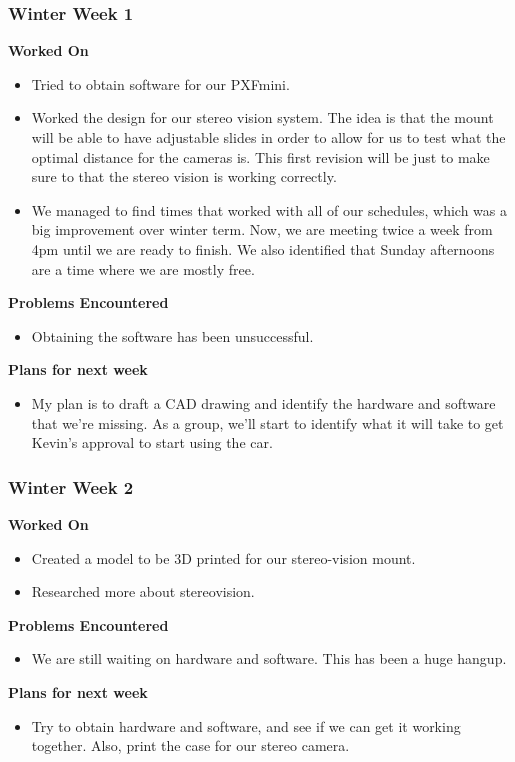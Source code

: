 \documentclass[compsoc,draftclsnofoot,onecolumn,10pt]{IEEEtran}
\begin{document}
\subsubsection*{Winter Week 1}
\textbf{Worked On}
\begin{itemize}
    \item Tried to obtain software for our PXFmini.
    \item Worked the design for our stereo vision system. The idea is that the mount will be able to have adjustable slides in order to allow for us to test what the optimal distance for the cameras is. This first revision will be just to make sure to that the stereo vision is working correctly.
    \item We managed to find times that worked with all of our schedules, which was a big improvement over winter term. Now, we are meeting twice a week from 4pm until we are ready to finish. We also identified that Sunday afternoons are a time where we are mostly free.
\end{itemize}
\textbf{Problems Encountered}
\begin{itemize}
    \item Obtaining the software has been unsuccessful.
\end{itemize}
\textbf{Plans for next week}
\begin{itemize}
    \item My plan is to draft a CAD drawing and identify the hardware and software that we're missing. As a group, we'll start to identify what it will take to get Kevin's approval to start using the car.
\end{itemize}


\subsubsection*{Winter Week 2}
\textbf{Worked On}
\begin{itemize}
    \item Created a model to be 3D printed for our stereo-vision mount. 
    \item Researched more about stereovision.
\end{itemize}
\textbf{Problems Encountered}
\begin{itemize}
    \item We are still waiting on hardware and software. This has been a huge hangup.
\end{itemize}
\textbf{Plans for next week}
\begin{itemize}
    \item Try to obtain hardware and software, and see if we can get it working together. Also, print the case for our stereo camera.
\end{itemize}
\end{document}
